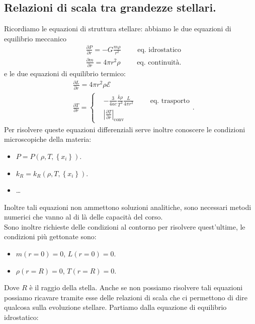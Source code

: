 \subsection{Relazioni di scala tra grandezze stellari.}%
\label{sub:Relazioni di scala tra grandezze stellari.}
Ricordiamo le equazioni di struttura stellare: abbiamo le due equazioni di equilibrio meccanico
\[\begin{aligned}
    & \frac{\partial P}{\partial r} = -G \frac{m\rho}{r^2} \qquad
    \text{ eq. idrostatico}\\
    & \frac{\partial m}{\partial r} = 4\pi r^2\rho \qquad
    \text{ eq. continuità}
.\end{aligned}\]
e le due equazioni di equilibrio termico:
\[\begin{aligned}
   &\frac{\partial L}{\partial r} = 4\pi r^2\rho\mathcal{E}\\
   &\frac{\partial T}{\partial r} =
   \begin{cases}
       &- \frac{3}{4ac}\frac{\overline{k}\rho}{T^3} \frac{L}{4\pi r^2} 
       \qquad \text{ eq. trasporto}\\
       & \left|
       \frac{\partial T}{\partial r} 
       \right|_\text{conv} 
   \end{cases}
.\end{aligned}\]
Per risolvere queste equazioni differenziali serve inoltre conoscere le condizioni microscopiche della materia:
\begin{itemize}
    \item $P=P(\rho,T,\left\{x_i\right\})$.
    \item $k_R = k_R(\rho,T, \left\{x_i\right\})$.
    \item \ldots
\end{itemize}
Inoltre tali equazioni non ammettono soluzioni analitiche, sono necessari metodi numerici che vanno al di là delle capacità del corso. \\
Sono inoltre richieste delle condizioni al contorno per risolvere quest'ultime, le condizioni più gettonate sono:
\begin{itemize}
    \item $m(r=0) = 0$, $L(r=0) = 0$.
    \item $\rho (r=R) =0$, $T(r=R) = 0$.
\end{itemize}
Dove $R$ è il raggio della stella. Anche se non possiamo risolvere tali equazioni possiamo ricavare tramite esse delle relazioni di scala che ci permettono di dire qualcosa sulla evoluzione stellare. Partiamo dalla equazione di equilibrio idrostatico:
